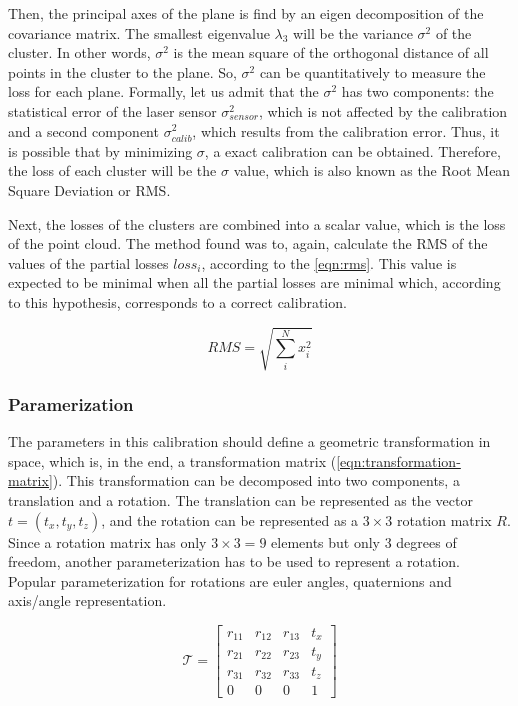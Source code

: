 Then, the principal axes of the plane is find by an eigen decomposition of the covariance matrix. The smallest eigenvalue $\lambda_3$ will be the variance $\sigma^2$ of the cluster. In other words, $\sigma^2$ is the mean square of the orthogonal distance of all points in the cluster to the plane. So, $\sigma^2$ can be quantitatively to measure the loss for each plane. Formally, let us admit that the $\sigma^2$ has two components: the statistical error of the laser sensor $\sigma^2_{sensor}$, which is not affected by the calibration and a second component $\sigma^2_{calib}$, which results from the calibration error. Thus, it is possible that by minimizing $\sigma$, a exact calibration can be obtained. Therefore, the loss of each cluster will be the $\sigma$ value, which is also known as the Root Mean Square Deviation or RMS.

Next, the losses of the clusters are combined into a scalar value, which is the loss of the point cloud. The method found was to, again, calculate the RMS of the values of the partial losses $loss_i$, according to the \cref{eqn:rms}. This value is expected to be minimal when all the partial losses are minimal which, according to this hypothesis, corresponds to a correct calibration.

\begin{equation}
    \label{eqn:rms}
    RMS = \sqrt{\sum_{i}^{N}{x_i^2}}
\end{equation}

\subsubsection{Paramerization}

The parameters in this calibration should define a geometric transformation in space, which is, in the end, a transformation matrix (\cref{eqn:transformation-matrix}). This transformation can be decomposed into two components, a translation and a rotation. The translation can be represented as the vector $t = (t_x, t_y, t_z)$, and the rotation can be represented as a $3 \times 3$ rotation matrix $R$. Since a rotation matrix has only $3 \times 3 = 9$ elements but only 3 degrees of freedom, another parameterization has to be used to represent a rotation. Popular parameterization for rotations are euler angles, quaternions and axis/angle representation. 

\begin{equation}
    \label{eqn:transformation-matrix}
    \mathcal{T} = \left[
        \begin{array}{cccc}
            r_{11} & r_{12} & r_{13} & t_x \\
            r_{21} & r_{22} & r_{23} & t_y \\
            r_{31} & r_{32} & r_{33} & t_z \\
            0      & 0      & 0      & 1   
        \end{array}
    \right]
\end{equation}

